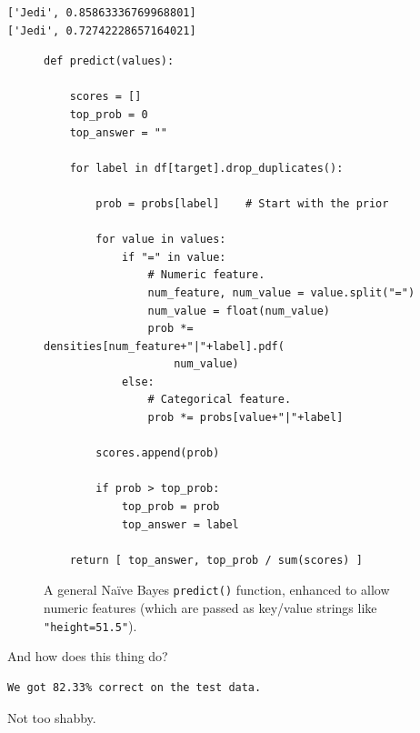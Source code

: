 \begin{Verbatim}[fontsize=\small,samepage=true,frame=leftline,framesep=5mm,framerule=1mm]
['Jedi', 0.85863336769968801]
['Jedi', 0.72742228657164021]
\end{Verbatim}

\begin{figure}[ht]
\centering
\begin{Verbatim}[fontsize=\footnotesize,samepage=true,frame=single,framesep=3mm]
def predict(values):

    scores = []
    top_prob = 0
    top_answer = ""

    for label in df[target].drop_duplicates():

        prob = probs[label]    # Start with the prior

        for value in values:
            if "=" in value:
                # Numeric feature.
                num_feature, num_value = value.split("=")
                num_value = float(num_value)
                prob *= densities[num_feature+"|"+label].pdf(
                    num_value)
            else:
                # Categorical feature.
                prob *= probs[value+"|"+label]

        scores.append(prob)

        if prob > top_prob:
            top_prob = prob
            top_answer = label

    return [ top_answer, top_prob / sum(scores) ]
\end{Verbatim}
\caption{A general Na\"{i}ve Bayes \texttt{predict()} function, enhanced to
allow numeric features (which are passed as key/value strings like
\texttt{"height=51.5"}).}
\label{generalNbWithNum}
\end{figure}

And how does this thing do?

\begin{Verbatim}[fontsize=\small,samepage=true,frame=leftline,framesep=5mm,framerule=1mm]
We got 82.33% correct on the test data.
\end{Verbatim}

Not too shabby.

